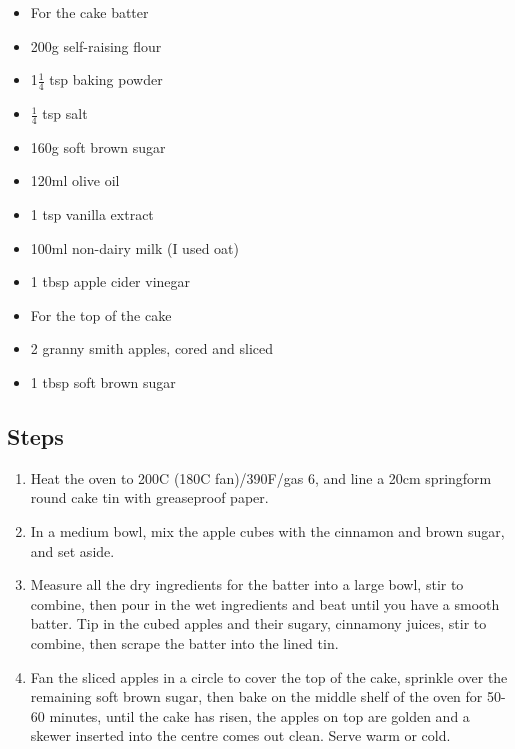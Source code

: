 \documentclass{book}
\begin{document}
\begin{itemize}
\item For the cake batter
\item 200g self-raising flour
\item 1$\frac{1}{4}$ tsp baking powder
\item $\frac{1}{4}$ tsp salt
\item 160g soft brown sugar
\item 120ml olive oil
\item 1 tsp vanilla extract
\item 100ml non-dairy milk (I used oat)
\item 1 tbsp apple cider vinegar
\end{itemize}

\begin{itemize}
\item For the top of the cake
\item 2 granny smith apples, cored and sliced
\item 1 tbsp soft brown sugar
\end{itemize}

\subsection*{Steps}
\begin{enumerate}
\item Heat the oven to 200C (180C fan)/390F/gas 6, and line a 20cm springform round cake tin with greaseproof paper.
\item In a medium bowl, mix the apple cubes with the cinnamon and brown sugar, and set aside.
\item Measure all the dry ingredients for the batter into a large bowl, stir to combine, then pour in the wet ingredients and beat until you have a smooth batter. Tip in the cubed apples and their sugary, cinnamony juices, stir to combine, then scrape the batter into the lined tin.
\item Fan the sliced apples in a circle to cover the top of the cake, sprinkle over the remaining soft brown sugar, then bake on the middle shelf of the oven for 50-60 minutes, until the cake has risen, the apples on top are golden and a skewer inserted into the centre comes out clean. Serve warm or cold.
\end{enumerate}
\newpage
\end{document}

